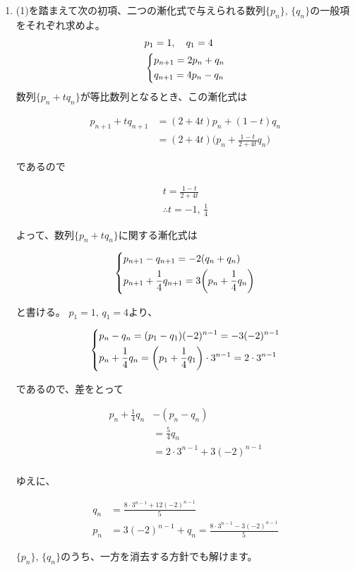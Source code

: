 \documentclass[a4paper]{ltjsarticle}
\newcommand{\flan}[1]{\begin{fleqn}[20pt]\begin{align*} #1 \end{align*}\end{fleqn}}
\begin{document}
\begin{ans*}
\begin{enumerate}[label=(\arabic*)]
  \item (1)を踏まえて次の初項、二つの漸化式で与えられる数列$\{p_n\},\, \{q_n\}$の一般項をそれぞれ求めよ。%
    \begin{align*}
      &p_1 = 1,\quad q_1 = 4\\
      &\begin{dcases*}
        p_{n+1} = 2p_n + q_n \\
        q_{n+1} = 4p_n - q_n
      \end{dcases*}
    \end{align*}
    数列$\{p_n + t q_n\}$が等比数列となるとき、この漸化式は
    \flan{
        p_{n+1} + tq_{n+1}
        &= (2 + 4t)p_n + (1 - t)q_n \\
        &= (2 + 4t)\biggl(p_n + \frac{1-t}{2+4t}q_n\biggr)
      }
    であるので
    \flan{
        t = \frac{1 - t}{2 + 4t} \\
        \therefore t = -1 ,\,\frac{1}{4}
      }
    よって、数列$\{p_n + t q_n\}$に関する漸化式は
    \flan{
        \begin{dcases*}
          p_{n+1} - q_{n+1} = -2(q_n + q_n) \\
          p_{n+1} + \frac{1}{4}q_{n+1} = 3\biggl(p_n + \frac{1}{4}q_n\biggr)
        \end{dcases*}
      }
    と書ける。
    $p_1 = 1,\,q_1 = 4$より、
    \flan{
        \begin{dcases*}
          p_n - q_n
          = (p_1 - q_1) (-2)^{n-1}
          = -3(-2)^{n-1} \\
          p_n + \frac{1}{4}q_n
          = \biggl(p_1 + \frac{1}{4}q_1\biggr)\cdot 3^{n-1}
          = 2\cdot 3^{n-1}
        \end{dcases*}
      }
    であるので、差をとって
    \flan{
        p_n + \frac{1}{4}q_n &  - (p_n - q_n) \\
        &= \frac{5}{4}q_n \\
        &= 2\cdot 3^{n-1} + 3(-2)^{n-1} \\
      }
    ゆえに、
    \flan{
        q_n &= \frac{8\cdot 3^{n-1} + 12(-2)^{n-1}}{5} \\
        p_n &= 3(-2)^{n-1} + q_n = \frac{8\cdot 3^{n-1} - 3 (-2)^{n-1}}{5}
      }
    \begin{other*}
      $\{p_{n}\},\,\{q_{n}\}$のうち、一方を消去する方針でも解けます。


\end{other*}
\end{enumerate}
\end{ans*}
\end{document}

